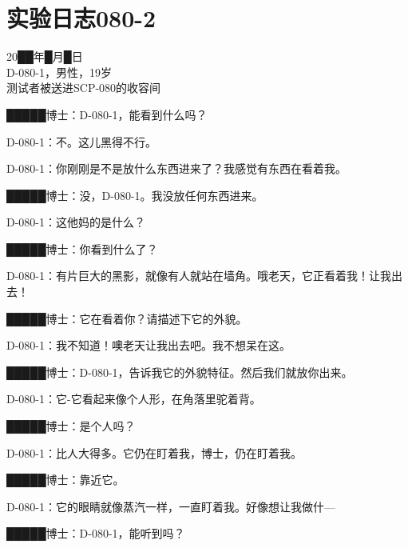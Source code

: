\chapter{实验日志080-2}

\label{chap:DOC-experiment-log-080-2}


20██年█月█日\\
D-080-1，男性，19岁\\
测试者被送进SCP-080的收容间\\


\begin{scpbox}


█████博士：D-080-1，能看到什么吗？

D-080-1：不。这儿黑得不行。


D-080-1：你刚刚是不是放什么东西进来了？我感觉有东西在看着我。

█████博士：没，D-080-1。我没放任何东西进来。

D-080-1：这他妈的是什么？

█████博士：你看到什么了？

D-080-1：有片巨大的黑影，就像有人就站在墙角。哦老天，它正看着我！让我出去！

█████博士：它在看着你？请描述下它的外貌。

D-080-1：我不知道！噢老天让我出去吧。我不想呆在这。

█████博士：D-080-1，告诉我它的外貌特征。然后我们就放你出来。

D-080-1：它-它看起来像个人形，在角落里驼着背。

█████博士：是个人吗？

D-080-1：比人大得多。它仍在盯着我，博士，仍在盯着我。

█████博士：靠近它。


D-080-1：它的眼睛就像蒸汽一样，一直盯着我。好像想让我做什—

█████博士：D-080-1，能听到吗？



\end{scpbox}

